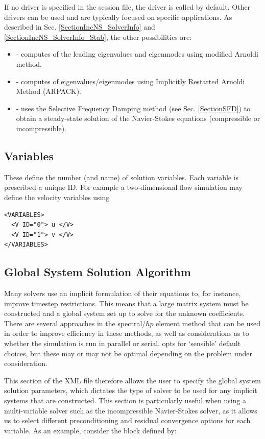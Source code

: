 If no driver is specified in the session file, the driver  is 
called by default. Other drivers can be used and are typically focused on
specific applications. As described in Sec.
\ref{SectionIncNS_SolverInfo} and  \ref{SectionIncNS_SolverInfo_Stab}, 
the other possibilities are:
\begin{itemize}
\item {}  - computes of the leading eigenvalues and 
eigenmodes using modified Arnoldi method.
\item {} - computes of eigenvalues/eigenmodes using Implicitly 
Restarted Arnoldi Method (ARPACK).
\item {} - uses the Selective Frequency Damping method 
(see Sec. \ref{SectionSFD}) to obtain a steady-state solution of the 
Navier-Stokes equations (compressible or incompressible).
\end{itemize}

\subsection{Variables}

These define the number (and name) of solution variables. Each variable is
prescribed a unique ID. For example a two-dimensional flow simulation may define
the velocity variables using

\begin{lstlisting}[style=XMLStyle]
<VARIABLES>
  <V ID="0"> u </V>
  <V ID="1"> v </V>
</VARIABLES>
\end{lstlisting}

\subsection{Global System Solution Algorithm}
\label{globalsyssoln}
Many \nekpp solvers use an implicit formulation of their equations to, for
instance, improve timestep restrictions. This means that a large matrix system
must be constructed and a global system set up to solve for the unknown
coefficients. There are several approaches in the spectral/$hp$ element method
that can be used in order to improve efficiency in these methods, as well as
considerations as to whether the simulation is run in parallel or serial. \nekpp
opts for `sensible' default choices, but these may or may not be optimal
depending on the problem under consideration.

This section of the XML file therefore allows the user to specify the global
system solution parameters, which dictates the type of solver to be used for any
implicit systems that are constructed. This section is particularly useful when
using a multi-variable solver such as the incompressible Navier-Stokes solver,
as it allows us to select different preconditioning and residual convergence
options for each variable. As an example, consider the block defined by:

